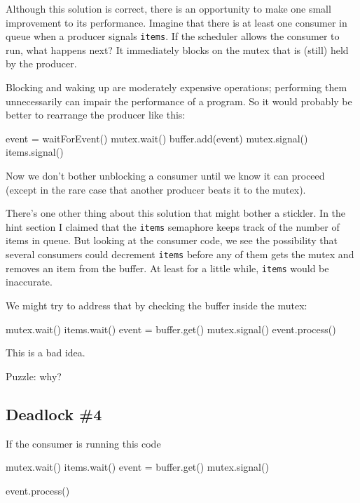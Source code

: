 \documentclass{book}
\begin{document}
Although this solution is correct, there is an opportunity
to make one small improvement to its performance.  Imagine
that there is at least one consumer in queue when a producer
signals {\tt items}.  If the scheduler allows the consumer
to run, what happens next?  It immediately blocks on the
mutex that is (still) held by the producer.

Blocking and waking up are moderately expensive operations;
performing them unnecessarily can impair the performance of
a program.  So it would probably be better to rearrange the
producer like this:

\begin{unbreakable}[title={Improved producer solution}]{}
event = waitForEvent()
mutex.wait()
    buffer.add(event)
mutex.signal()
items.signal()
\end{unbreakable}

Now we don't bother unblocking a consumer until we know it can proceed
(except in the rare case that another producer beats it to the mutex).

There's one other thing about this solution that might bother
a stickler.  In the hint section I claimed that the {\tt items}
semaphore keeps track of the number of items in queue.  But looking
at the consumer code, we see the possibility that several consumers
could decrement {\tt items} before any of them gets the mutex
and removes an item from the buffer.  At least for a little while,
{\tt items} would be inaccurate.

We might try to address that by checking the buffer inside the
mutex:

\begin{unbreakable}[title={Broken consumer solution}]{}
mutex.wait()
    items.wait()
    event = buffer.get()
mutex.signal()
event.process()
\end{unbreakable}

This is a bad idea.

Puzzle: why?



\subsection{Deadlock \#4}

If the consumer is running this code

\begin{unbreakable}[title={Broken consumer solution}]{}
mutex.wait()
    items.wait()
    event = buffer.get()
mutex.signal()

event.process()
\end{unbreakable}
\end{document}
